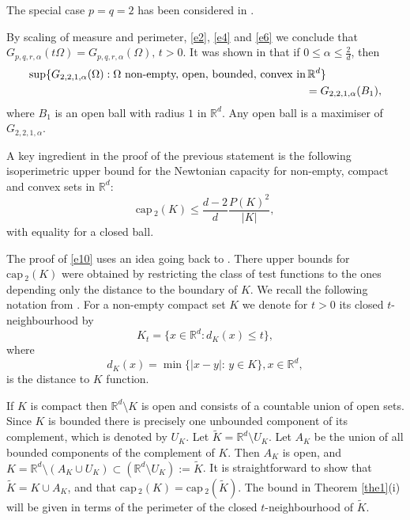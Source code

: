 \documentclass[a4paper,9pt]{article}
\newcommand{\R}{\mathbb{R}}
\def\cp{\mathrm{cap}\,}
\newcommand{\Om}{\Omega}
\begin{document}
The special case $p=q=2$ has been considered in \cite{vdB1,MB,MM}.

By scaling of measure and perimeter, \eqref{e2}, \eqref{e4} and \eqref{e6} we conclude that $G_{p,q,r,\alpha}(t\Om)=G_{p,q,r,\alpha}(\Om),\,t>0$.
It was shown in  \cite[Theorem 3]{vdB1} that if $0\le \alpha\le \frac{2}{d}$, then
\begin{align*}%
\sup\{G_{2,2,1,\alpha}(\Omega): \Omega\,\, \textup{non-empty, open, bounded, convex in}&\, \R^d\}\nonumber\\&
=G_{2,2,1,\alpha}(B_1),
\end{align*}
where $B_1$ is an open ball with radius $1$ in $\R^d$. Any open ball is a maximiser of $G_{2,2,1,\alpha}$.

A key ingredient in the proof of the previous statement is the following isoperimetric upper bound \cite[(6)]{vdB1} for the Newtonian capacity for non-empty, compact and convex sets in $\R^d$:
\begin{equation}\label{e10}
\cp_2(K)\le \frac{d-2}{d}\frac{P(K)^2}{|K|},
\end{equation}
with equality for a closed ball.

The proof of \eqref{e10} uses an idea going back to \cite{CFG}. There upper bounds for $\cp_2(K)$ were obtained by restricting the class of test functions to the ones depending only the distance to the boundary of $K$.
We recall the following notation from \cite{vdB1}. For a non-empty compact set $K$ we denote for $t>0$ its closed $t$-neighbourhood by
\begin{equation}\label{e11}
K_t=\{x\in\R^d: d_K(x)\le t\},
\end{equation}
where
\begin{equation*}%
d_K(x)=\min\{|x-y|:\,y\in K\},x\in \R^d,
\end{equation*}
is the distance to $K$ function.

If $K$ is compact then $\R^d\setminus K$ is open and consists of a countable union of open sets. Since $K$ is bounded there is precisely one unbounded component of its complement, which is denoted by $U_K$. Let $\tilde{K}= \R^d\setminus U_K$. Let $A_K$ be the union of all bounded components of the complement of $K$. Then $A_K$ is open, and $K=\R^d\setminus(A_K\cup U_K)\subset (\R^d\setminus U_K):=\tilde{K}$. It is straightforward to show that $\tilde{K}=K\cup A_K$, and that $\cp_2(K)=\cp_2(\tilde{K})$.
The  bound in Theorem \ref{the1}(i) will be given in terms of the perimeter of the closed $t$-neighbourhood of $\tilde{K}$.
\end{document}
